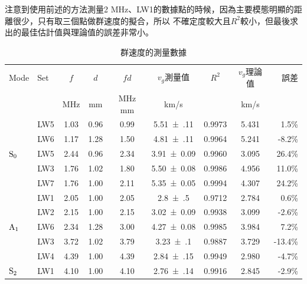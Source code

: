 \documentclass[12pt]{report}
\begin{document}
注意到使用前述的方法測量2 MHz、LW1的數據點的時候，因為主要模態明顯的距離很少，只有取三個點做群速度的擬合，所以
不確定度較大且$R^2$較小，但最後求出的最佳估計值與理論值的誤差非常小。

\begin{table}[htbp]
    \centering
    \caption{群速度的測量數據}
    \label{tab:phy23}
    \begin{tabular}{@{}llccccccr@{}}
    \toprule
    Mode                         & Set & $f$  & $d$  & $fd$ & $v_g$測量值    & $R^2$  & $v_g$理論值& 誤差     \\
                             &  & MHz & mm & MHz mm & km/s    &   & km/s &      \\ \midrule
    \multirow{5}{*}{${\rm S_0}$} & LW5 & 1.03    & 0.96   & 0.99      & \SI{5.51(11)}{} & 0.9973 & 5.431          & 1.5\%   \\
                                 & LW6 & 1.17    & 1.28   & 1.50      & \SI{4.81(11)}{} & 0.9964 & 5.241          & -8.2\%  \\
                                 & LW5 & 2.44    & 0.96   & 2.34      & \SI{3.91(9)}{} & 0.9960 & 3.095          & 26.4\%  \\
                                 & LW3 & 1.76    & 1.02   & 1.80      & \SI{5.50(8)}{} & 0.9986 & 4.956          & 11.0\%  \\
                                 & LW7 & 1.76    & 1.00   & 2.11       & \SI{5.35(5)}{} & 0.9994 & 4.307          & 24.2\%  \\ \midrule
    \multirow{5}{*}{${\rm A_1}$} & LW1 & 2.05    & 1.00      & 2.05        & \SI{2.8(5)}{}   & 0.9712 & 2.784          & 0.6\%   \\
                                 & LW2 & 2.15    & 1.00   & 2.15        & \SI{3.02(9)}{} & 0.9938 & 3.099          & -2.6\%  \\
                                 & LW6 & 2.34    & 1.28   & 3.00      & \SI{4.27(8)}{} & 0.9985 & 3.984          & 7.2\%   \\
                                 & LW3 & 3.72    & 1.02   & 3.79      & \SI{3.23(10)}{} & 0.9887 & 3.729          & -13.4\% \\
                                 & LW4 & 4.39    & 1.00   & 4.39        & \SI{2.84(15)}{} & 0.9949 & 2.980          & -4.7\%  \\ \midrule
    ${\rm S_2}$                  & LW1 & 4.10     & 1.00   & 4.10        & \SI{2.76(14)}{}  & 0.9916 & 2.845          & -2.9\%  \\ \bottomrule
    \end{tabular}
\end{table}
\end{document}
